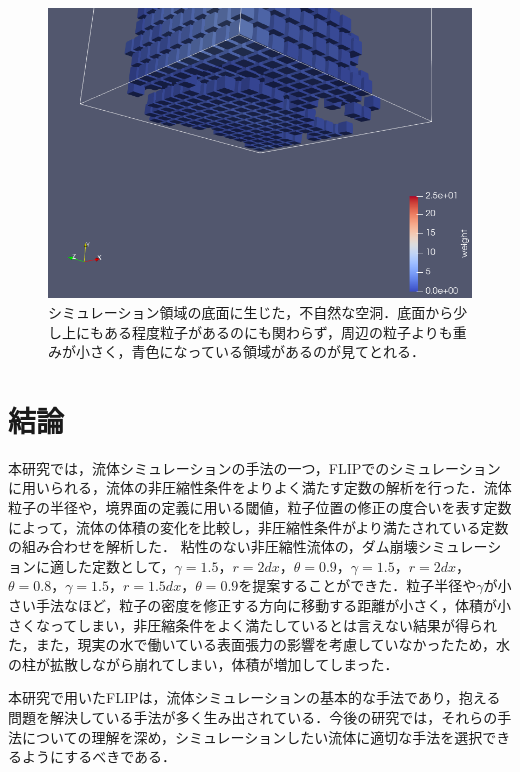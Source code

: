 \documentclass[a4j,12pt]{jreport}
\begin{document}
\begin{figure}[htbp]
\begin{center}
\includegraphics[width=160mm]{artificial_space.png}
\end{center}
\caption{シミュレーション領域の底面に生じた，不自然な空洞．底面から少し上にもある程度粒子があるのにも関わらず，周辺の粒子よりも重みが小さく，青色になっている領域があるのが見てとれる．}
\label{fig:space}
\end{figure}

\chapter{結論} \label{chapter:6}
本研究では，流体シミュレーションの手法の一つ，FLIPでのシミュレーションに用いられる，流体の非圧縮性条件をよりよく満たす定数の解析を行った．流体粒子の半径や，境界面の定義に用いる閾値，粒子位置の修正の度合いを表す定数によって，流体の体積の変化を比較し，非圧縮性条件がより満たされている定数の組み合わせを解析した．
粘性のない非圧縮性流体の，ダム崩壊シミュレーションに適した定数として，$\gamma = 1.5$，$r = 2dx$，$\theta = 0.9$，$\gamma = 1.5$，$r = 2dx$，$\theta = 0.8$，$\gamma = 1.5$，$r = 1.5dx$，$\theta = 0.9$を提案することができた．粒子半径や$\gamma$が小さい手法なほど，粒子の密度を修正する方向に移動する距離が小さく，体積が小さくなってしまい，非圧縮条件をよく満たしているとは言えない結果が得られた，また，現実の水で働いている表面張力の影響を考慮していなかったため，水の柱が拡散しながら崩れてしまい，体積が増加してしまった．

本研究で用いたFLIPは，流体シミュレーションの基本的な手法であり，抱える問題を解決している手法が多く生み出されている．今後の研究では，それらの手法についての理解を深め，シミュレーションしたい流体に適切な手法を選択できるようにするべきである．
\end{document}
